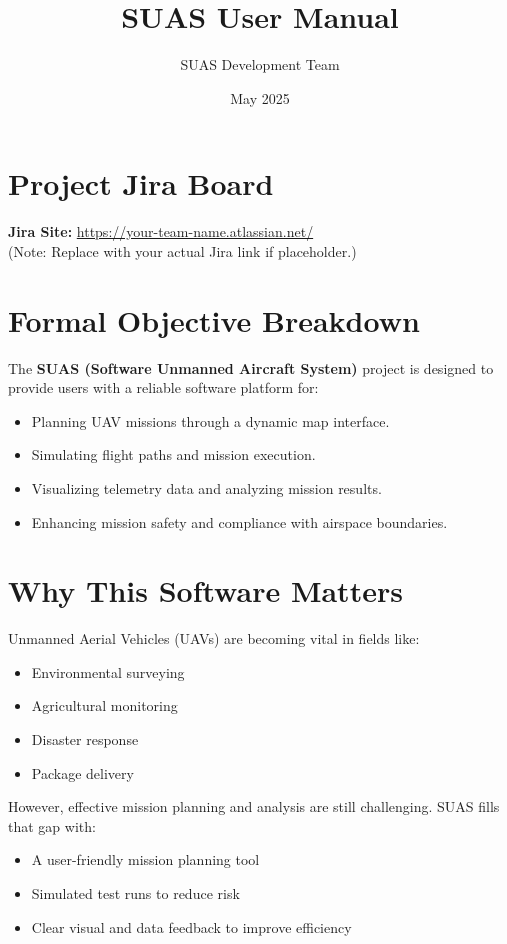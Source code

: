 \documentclass{article}
\title{SUAS User Manual}
\author{SUAS Development Team}
\date{May 2025}
\begin{document}
\maketitle
\vspace{1cm}
\tableofcontents
\newpage

\section{Project Jira Board}
\textbf{Jira Site:} \href{https://your-team-name.atlassian.net/}{https://your-team-name.atlassian.net/} \\
(Note: Replace with your actual Jira link if placeholder.)

\section{Formal Objective Breakdown}
The \textbf{SUAS (Software Unmanned Aircraft System)} project is designed to provide users with a reliable software platform for:
\begin{itemize}
    \item Planning UAV missions through a dynamic map interface.
    \item Simulating flight paths and mission execution.
    \item Visualizing telemetry data and analyzing mission results.
    \item Enhancing mission safety and compliance with airspace boundaries.
\end{itemize}

\section{Why This Software Matters}
Unmanned Aerial Vehicles (UAVs) are becoming vital in fields like:
\begin{itemize}
    \item Environmental surveying
    \item Agricultural monitoring
    \item Disaster response
    \item Package delivery
\end{itemize}

However, effective mission planning and analysis are still challenging. SUAS fills that gap with:
\begin{itemize}
    \item A user-friendly mission planning tool
    \item Simulated test runs to reduce risk
    \item Clear visual and data feedback to improve efficiency
\end{itemize}
\end{document}
